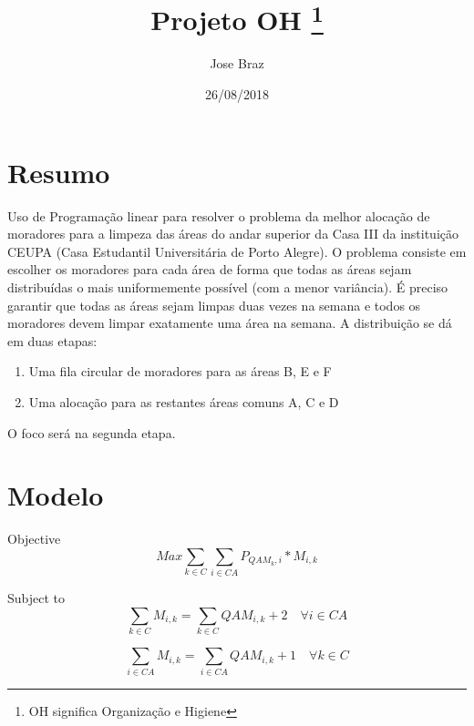 \documentclass{article}
\begin{document}
	\title{Projeto OH \footnote{OH significa Organização e Higiene}}
	\author{Jose Braz}
	\date{26/08/2018}

	\maketitle

	\section{Resumo}

	Uso de Programação linear para resolver o problema da melhor alocação de
	moradores para a limpeza das áreas do andar superior da Casa III da instituição
	CEUPA (Casa Estudantil Universitária de Porto Alegre). O problema consiste
	em escolher os moradores para cada área de forma que todas as áreas sejam
	distribuídas o mais uniformemente possível (com a menor variância). É
	preciso garantir que todas as áreas sejam limpas duas vezes na semana e todos
	os moradores devem limpar exatamente uma área na semana.
	A distribuição se dá em duas etapas:

	\begin{enumerate}
		\item Uma fila circular de moradores para as áreas B, E e F
		\item Uma alocação para as restantes áreas comuns A, C e D
	\end{enumerate}

	O foco será na segunda etapa.

	\section{Modelo}

	Objective \\
	\begin{equation} \label{obj}
		Max \sum_{k \in C}{\sum_{i \in CA}{P_{QAM_k, i} * M_{i,k}}}
	\end{equation}

	Subject to \\
	\begin{equation} \label{row_r}
		\sum_{k \in C}{M_{i,k}} = \sum_{k \in C}{QAM_{i,k}} + 2 \quad \forall i \in CA
	\end{equation}

	\begin{equation} \label{columm_r}
		\sum_{i \in CA}{M_{i,k}} = \sum_{i \in CA}{QAM_{i,k}} + 1 \quad \forall k \in C
	\end{equation}
\end{document}
